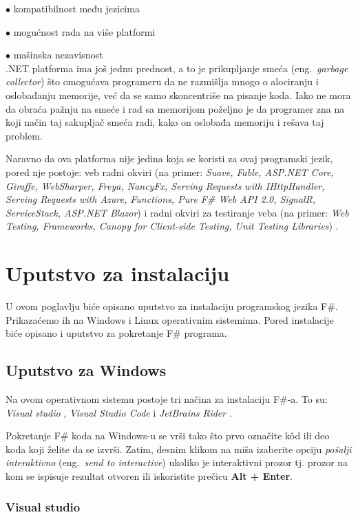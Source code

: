 \documentclass[a4paper]{article}
\begin{document}
	$\bullet$ kompatibilnost među jezicima
	
	$\bullet$ mogućnost rada na više platformi
	
	$\bullet$ mašinska nezavisnost
\\

.NET platforma ima još jednu prednost, a to je prikupljanje smeća (eng.~{\em garbage collector}) što omogućava programeru da ne razmišlja mnogo o alociranju i oslobađanju memorije, već da se samo skoncentriše na pisanje koda. Iako ne mora da obraća pažnju na smeće i rad sa memorijom poželjno je da programer zna na koji način taj sakupljač smeća radi, kako on oslobađa memoriju i rešava taj problem.

Naravno da ova platforma nije jedina koja se koristi za ovaj programski jezik, pored nje postoje: veb radni okviri (na primer: {\em Suave, Fable, ASP.NET Core, Giraffe, WebSharper, Freya, NancyFx, Serving Requests with IHttpHandler, Serving Requests with Azure, Functions, Pure F\# Web API 2.0, SignalR, ServiceStack, ASP.NET Blazor}) i radni okviri za testiranje veba (na primer: {\em Web Testing, Frameworks, Canopy for Client-side Testing, Unit Testing Libraries}) \cite{fwFs}.

\section{Uputstvo za instalaciju}

U ovom poglavlju biće opisano uputstvo za instalaciju programskog jezika F\#. Prikazaćemo ih na Windows i Linux operativnim sistemima. Pored instalacije biće opisano i uputstvo za pokretanje F\# programa.

\subsection{Uputstvo za Windows}

Na ovom operativnom sistemu postoje tri načina za instalaciju F\#-a. To su: {\em Visual studio} \cite{vStud}, {\em Visual Studio Code} \cite{vStudCode} i {\em JetBrains Rider} \cite{jetBrains}.

Pokretanje F\# koda na Windows-u se vrši tako što prvo označite kôd ili deo koda koji želite da se izvrši. Zatim, desnim klikom na miša izaberite opciju {\em pošalji interaktivno} (eng.~{\em send to interactive}) ukoliko je interaktivni prozor tj. prozor na kom se ispisuje rezultat otvoren ili iskoristite prečicu \textbf{Alt + Enter}.

\subsubsection{Visual studio}
	
\end{document}
